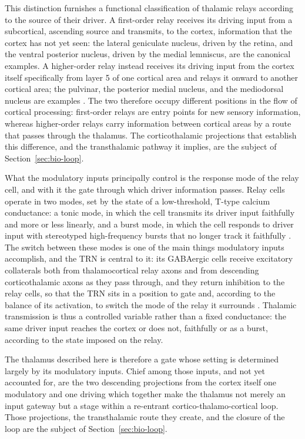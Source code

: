 This distinction furnishes a functional classification of thalamic relays according to the source of their driver. A first-order relay receives its driving input from a subcortical, ascending source and transmits, to the cortex, information that the cortex has not yet seen: the lateral geniculate nucleus, driven by the retina, and the ventral posterior nucleus, driven by the medial lemniscus, are the canonical examples. A higher-order relay instead receives its driving input from the cortex itself  specifically from layer 5 of one cortical area  and relays it onward to another cortical area; the pulvinar, the posterior medial nucleus, and the mediodorsal nucleus are examples \parencite{sherman2013}. The two therefore occupy different positions in the flow of cortical processing: first-order relays are entry points for new sensory information, whereas higher-order relays carry information between cortical areas by a route that passes through the thalamus. The corticothalamic projections that establish this difference, and the transthalamic pathway it implies, are the subject of Section~\ref{sec:bio-loop}.

What the modulatory inputs principally control is the response mode of the relay cell, and with it the gate through which driver information passes. Relay cells operate in two modes, set by the state of a low-threshold, T-type calcium conductance: a tonic mode, in which the cell transmits its driver input faithfully and more or less linearly, and a burst mode, in which the cell responds to driver input with stereotyped high-frequency bursts that no longer track it faithfully \parencite{sherman1998, sherman2013}. The switch between these modes is one of the main things modulatory inputs accomplish, and the TRN is central to it: its GABAergic cells receive excitatory collaterals both from thalamocortical relay axons and from descending corticothalamic axons as they pass through, and they return inhibition to the relay cells, so that the TRN sits in a position to gate  and, according to the balance of its activation, to switch the mode of  the relay it surrounds \parencite{sherman2013, shepherd2018}. Thalamic transmission is thus a controlled variable rather than a fixed conductance: the same driver input reaches the cortex or does not, faithfully or as a burst, according to the state imposed on the relay.

The thalamus described here is therefore a gate whose setting is determined largely by its modulatory inputs. Chief among those inputs, and not yet accounted for, are the two descending projections from the cortex itself  one modulatory and one driving  which together make the thalamus not merely an input gateway but a stage within a re-entrant cortico-thalamo-cortical loop. Those projections, the transthalamic route they create, and the closure of the loop are the subject of Section~\ref{sec:bio-loop}.


